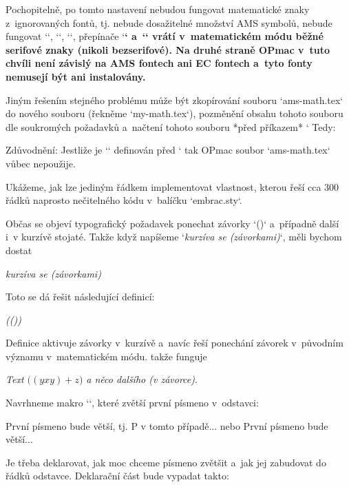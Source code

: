 Pochopitelně, po tomto nastavení nebudou fungovat matematické znaky z~ignorovaných fontů, tj. nebude dosažitelné množství AMS symbolů, nebude fungovat `\script`, `\frak`, `\bbchar`, přepínače `\bf` a~`\bi` vrátí v~matematickém módu běžné serifové znaky (nikoli bezserifové). Na druhé straně OPmac v~tuto chvíli není závislý na AMS fontech ani EC fontech a~tyto fonty nemusejí být ani instalovány. 



Jiným řešením stejného problému může být zkopírování souboru `ams-math.tex` do nového souboru (řekněme `my-math.tex`), pozměnění obsahu tohoto souboru dle soukromých požadavků a~načtení tohoto souboru *před příkazem* ` Tedy: 

\begtt
 
 
\endtt


Zdůvodnění: Jestliže je `\normalmath` definován před ` tak OPmac soubor `ams-math.tex` vůbec nepoužije. 


 


Ukážeme, jak lze jediným řádkem implementovat vlastnost, kterou řeší cca 300 řádků naprosto nečitelného kódu v~balíčku `embrac.sty`. 



Občas se objeví typografický požadavek ponechat závorky `()` a~případně další i~v kurzívě stojaté. Takže když napíšeme `{\em kurzíva se (závorkami)}`, měli bychom dostat 

\begtt
{\it kurzíva se {\rm(}závorkami{\/\rm)}} 
\endtt


Toto se dá řešit následující definicí: 

\begtt
\addto\em{\adef({\ifmmode(\else{\rm(}\fi}\adef){\ifmmode)\else{\/\rm)}\fi}} 
\endtt


Definice aktivuje závorky v~kurzívě a~navíc řeší ponechání závorek v~původním významu v~matematickém módu. takže funguje 

\begtt
{\em Text $\bigl((yxy)+z\bigr)$ a něco dalšího (v závorce)}. 
\endtt

 


Navrhneme makro `\Capinsert`, které zvětší první písmeno v~odstavci: 

\begtt
\Capinsert První písmeno bude větší, tj. P v tomto případě... 
nebo 
 První písmeno bude větší... 
\endtt


Je třeba deklarovat, jak moc chceme písmeno zvětšit a~jak jej zabudovat do řádků odstavce. Deklarační část bude vypadat takto: 

